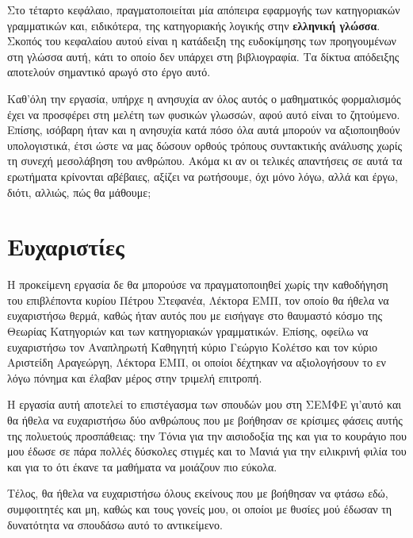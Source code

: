 \documentclass [a4paper,11pt] {book}
\theoremstyle{definition}
\theoremstyle{definition}
\begin{document}
Στο τέταρτο κεφάλαιο, πραγματοποιείται μία απόπειρα εφαρμογής των κατηγοριακών γραμματικών και, ειδικότερα, της κατηγοριακής λογικής στην \textbf{ελληνική γλώσσα}. Σκοπός του κεφαλαίου αυτού είναι η κατάδειξη της ευδοκίμησης των προηγουμένων στη γλώσσα αυτή, κάτι το οποίο δεν υπάρχει στη βιβλιογραφία. Τα δίκτυα απόδειξης αποτελούν σημαντικό αρωγό στο έργο αυτό.

Καθ'όλη την εργασία, υπήρχε η ανησυχία αν όλος αυτός ο μαθηματικός φορμαλισμός έχει να προσφέρει στη μελέτη των φυσικών γλωσσών, αφού αυτό είναι το ζητούμενο. Επίσης, ισόβαρη ήταν και η ανησυχία κατά πόσο όλα αυτά μπορούν να αξιοποιηθούν υπολογιστικά, έτσι ώστε να μας δώσουν ορθούς τρόπους συντακτικής ανάλυσης χωρίς τη συνεχή μεσολάβηση του ανθρώπου. Ακόμα κι αν οι τελικές απαντήσεις σε αυτά τα ερωτήματα κρίνονται αβέβαιες, αξίζει να ρωτήσουμε, όχι μόνο λόγω, αλλά και έργω, διότι, αλλιώς, πώς θα μάθουμε;
\chapter*{Ευχαριστίες}
Η προκείμενη εργασία δε θα μπορούσε να πραγματοποιηθεί χωρίς την καθοδήγηση του επιβλέποντα κυρίου Πέτρου Στεφανέα, Λέκτορα ΕΜΠ, τον οποίο θα ήθελα να ευχαριστήσω θερμά, καθώς ήταν αυτός που με εισήγαγε στο θαυμαστό κόσμο της Θεωρίας Κατηγοριών και των κατηγοριακών γραμματικών. Επίσης, οφείλω να ευχαριστήσω τον Αναπληρωτή Καθηγητή κύριο Γεώργιο Κολέτσο και τον κύριο Αριστείδη Αραγεώργη, Λέκτορα ΕΜΠ, οι οποίοι δέχτηκαν να αξιολογήσουν το εν λόγω πόνημα και έλαβαν μέρος στην τριμελή επιτροπή.

Η εργασία αυτή αποτελεί το επιστέγασμα των σπουδών μου στη ΣΕΜΦΕ γι'αυτό και θα ήθελα να ευχαριστήσω δύο ανθρώπους που με βοήθησαν σε κρίσιμες φάσεις αυτής της πολυετούς προσπάθειας: την Τόνια για την αισιοδοξία της και για το κουράγιο που μου έδωσε σε πάρα πολλές δύσκολες στιγμές και το Μανιά για την ειλικρινή φιλία του και για το ότι έκανε τα μαθήματα να μοιάζουν πιο εύκολα.

Τέλος, θα ήθελα να ευχαριστήσω όλους εκείνους που με βοήθησαν να φτάσω εδώ, συμφοιτητές και μη, καθώς και τους γονείς μου, οι οποίοι με θυσίες μού έδωσαν τη δυνατότητα να σπουδάσω αυτό το αντικείμενο.
\cleardoublepage
\begingroup
\hypersetup{linkcolor=black}
\tableofcontents

\clearpage

\listoffigures
\cleardoublepage
{}
\listoftables
\end{document}
